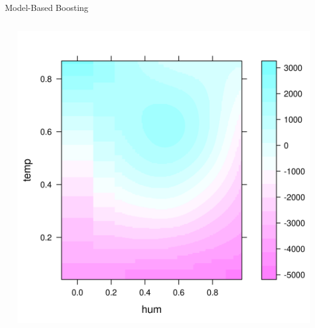 \documentclass[11pt,compress,t,notes=noshow, aspectratio=169, xcolor=table]{beamer}
\begin{document}
\begin{frame}{Model-Based Boosting}
\begin{columns}[T]
\begin{column}{0.55\textwidth}
\scriptsize

\end{column}
\begin{column}{0.45\textwidth}  %
  \includegraphics[width = \textwidth]{figure/mboost_effect_plot.png}
\end{column}
\end{columns}
\end{frame}
\end{document}
